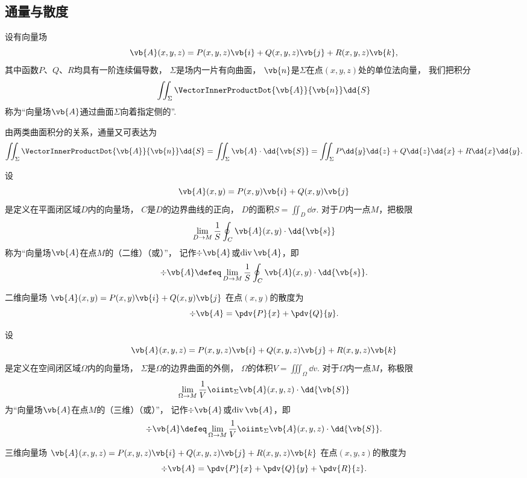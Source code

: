 \subsection{通量与散度}
\begin{definition}
设有向量场\[
	\vb{A}(x,y,z)=P(x,y,z)\vb{i}+Q(x,y,z)\vb{j}+R(x,y,z)\vb{k},
\]
其中函数\(P\)、\(Q\)、\(R\)均具有一阶连续偏导数，
\(\Sigma\)是场内一片有向曲面，
\(\vb{n}\)是\(\Sigma\)在点\((x,y,z)\)处的单位法向量，
我们把积分\[
	\iint_\Sigma \VectorInnerProductDot{\vb{A}}{\vb{n}} \dd{S}
\]称为“向量场\(\vb{A}\)通过曲面\(\Sigma\)向着指定侧的”.
\end{definition}
由两类曲面积分的关系，通量又可表达为\[
	\iint_\Sigma \VectorInnerProductDot{\vb{A}}{\vb{n}} \dd{S}
	=\iint_\Sigma \vb{A}\cdot\dd{\vb{S}}
	=\iint_\Sigma P\dd{y}\dd{z}+Q\dd{z}\dd{x}+R\dd{x}\dd{y}.
\]

\begin{definition}[平面上的散度]
\def\defofdiv{\lim_{D \to M} \frac{1}{S} \oint_C \vb{A}(x,y) \cdot \dd{\vb{s}}}%
设\[
	\vb{A}(x,y)=P(x,y)\vb{i}+Q(x,y)\vb{j}
\]是定义在平面闭区域\(D\)内的向量场，
\(C\)是\(D\)的边界曲线的正向，
\(D\)的面积\(S = \iint_{D} \dd{\sigma}\).
对于\(D\)内一点\(M\)，把极限\[
	\defofdiv
\]称为“向量场\(\vb{A}\)在点\(M\)的（二维）（或）”，
记作\(\div{\vb{A}}\)或\(\operatorname{div}\vb{A}\)，即\[
	\div{\vb{A}} \defeq \defofdiv.
\]
\end{definition}

\begin{proposition}
二维向量场
\(\vb{A}(x,y)=P(x,y)\vb{i}+Q(x,y)\vb{j}\)
在点\((x,y)\)的散度为\[
	\div{\vb{A}} = \pdv{P}{x}+\pdv{Q}{y}.
\]
\end{proposition}

\begin{definition}[空间中的散度]
\def\defofdiv{\lim_{\Omega \to M} \frac{1}{V} \oiint_\Sigma \vb{A}(x,y,z) \cdot \dd{\vb{S}}}%
设\[
	\vb{A}(x,y,z)=P(x,y,z)\vb{i}+Q(x,y,z)\vb{j}+R(x,y,z)\vb{k}
\]是定义在空间闭区域\(\Omega\)内的向量场，
\(\Sigma\)是\(\Omega\)的边界曲面的外侧，
\(\Omega\)的体积\(V = \iiint_\Omega \dd{v}\).
对于\(\Omega\)内一点\(M\)，称极限\[
	\defofdiv
\]为“向量场\(\vb{A}\)在点\(M\)的（三维）（或）”，
记作\(\div{\vb{A}}\)或\(\operatorname{div}\vb{A}\)，即\[
	\div{\vb{A}} \defeq \defofdiv.
\]
\end{definition}

\begin{proposition}
三维向量场
\(\vb{A}(x,y,z)=P(x,y,z)\vb{i}+Q(x,y,z)\vb{j}+R(x,y,z)\vb{k}\)
在点\((x,y,z)\)的散度为\[
	\div{\vb{A}}
	= \pdv{P}{x}+\pdv{Q}{y}+\pdv{R}{z}.
\]
\end{proposition}

